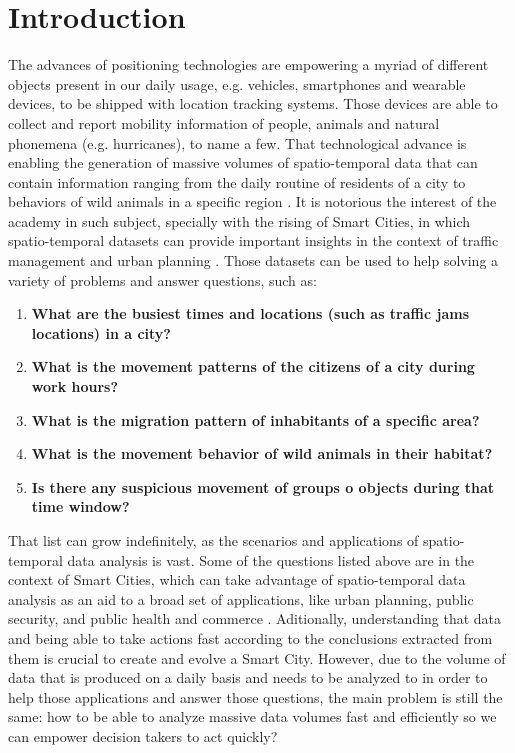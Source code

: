 \chapter{Introduction}
\label{chp:introduction}
The advances of positioning technologies are empowering a myriad of different objects present in our daily usage, e.g.
vehicles, smartphones and wearable devices, to be shipped with location tracking systems. Those devices are able to
collect and report mobility information of people, animals and natural phonemena (e.g. hurricanes), to name a few. That
technological advance is enabling the generation of massive volumes of spatio-temporal data that can contain information
ranging from the daily routine of residents of a city \citep{whatdidyoudo} to behaviors of wild animals in a specific
region \citep{trajclustering}\citep{miningperiodic}. It is notorious the interest of the academy in such subject,
specially with the rising of Smart Cities, in which spatio-temporal datasets can provide important insights in the
context of traffic management and urban planning \citep{gissmartcities}\citep{parallelsmartcities}. Those datasets can
be used to help solving a variety of problems and answer questions, such as:

\begin{enumerate}
    \item \textbf{What are the busiest times and locations (such as traffic jams locations) in a city?}
        \citep{visualtrafficjam}
    \item \textbf{What is the movement patterns of the citizens of a city during work hours?}
    \item \textbf{What is the migration pattern of inhabitants of a specific area?}
    \item \textbf{What is the movement behavior of wild animals in their habitat?} \citep{movemine}
    \item \textbf{Is there any suspicious movement of groups o objects during that time window?}
\end{enumerate}

That list can grow indefinitely, as the scenarios and applications of spatio-temporal data analysis is vast. Some of the
questions listed above are in the context of Smart Cities, which can take advantage of spatio-temporal data analysis as
an aid to a broad set of applications, like urban planning, public security, and public health and commerce
\citep{ieeesmartcities}. Aditionally, understanding that data and being able to take actions fast according to the
conclusions extracted from them is crucial to create and evolve a Smart City. However, due to the volume of data that is
produced on a daily basis and needs to be analyzed to in order to help those applications and answer those questions,
the main problem is still the same: how to be able to analyze massive data volumes fast and efficiently so we can
empower decision takers to act quickly?

